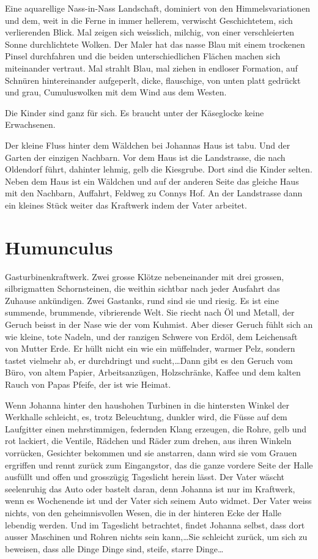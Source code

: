 \documentclass[10pt,titlepage,a5paper]{book}
\begin{document}
Eine aquarellige Nass-in-Nass Landschaft, dominiert von den Himmelsvariationen und dem, weit in die Ferne in immer hellerem, verwischt Geschichtetem, sich verlierenden Blick. Mal zeigen sich weisslich, milchig, von einer verschleierten Sonne durchlichtete Wolken. Der Maler hat das nasse Blau mit einem trockenen Pinsel durchfahren und die beiden unterschiedlichen Flächen machen sich miteinander vertraut. Mal strahlt Blau, mal ziehen in endloser Formation, auf Schnüren hintereinander aufgeperlt, dicke, flauschige,  von unten platt gedrückt und grau, Cumuluswolken mit dem Wind aus dem Westen.

Die Kinder sind ganz für sich. Es braucht unter der Käseglocke keine Erwachsenen. 

Der kleine Fluss hinter dem Wäldchen bei Johannas Haus ist tabu. Und der Garten der einzigen Nachbarn. Vor dem Haus ist die Landstrasse, die nach Oldendorf führt, dahinter lehmig, gelb die Kiesgrube. Dort sind die Kinder selten. Neben dem Haus ist ein Wäldchen und auf der anderen Seite das gleiche Haus mit den Nachbarn, Auffahrt, Feldweg zu Connys Hof. An der Landstrasse dann ein kleines Stück weiter das Kraftwerk indem der Vater arbeitet.



\section*{Humunculus}



Gasturbinenkraftwerk. Zwei grosse Klötze nebeneinander mit drei grossen, silbrigmatten Schornsteinen, die weithin sichtbar nach jeder Ausfahrt das Zuhause ankündigen. Zwei Gastanks, rund sind sie und riesig. Es ist eine summende, brummende, vibrierende Welt. Sie riecht nach Öl und Metall, der Geruch beisst in der Nase wie der vom Kuhmist. Aber dieser Geruch fühlt sich an wie kleine, tote Nadeln, und der ranzigen Schwere von Erdöl, dem Leichensaft von Mutter Erde. Er hüllt nicht ein wie ein müffelnder, warmer Pelz, sondern tastet vielmehr ab, er durchdringt und sucht,\dots Dann gibt es den Geruch vom Büro, von altem Papier, Arbeitsanzügen, Holzschränke, Kaffee und dem kalten Rauch von Papas Pfeife, der ist wie Heimat.

Wenn Johanna hinter den haushohen Turbinen in die hintersten Winkel der Werkhalle schleicht, es, trotz Beleuchtung, dunkler wird, die Füsse auf dem Laufgitter einen mehrstimmigen, federnden Kl\-ang erzeugen, die Rohre, gelb und rot lackiert, die Ventile, Rädchen und Räder zum drehen, aus ihren Winkeln vorrücken, Gesichter bekommen und sie anstarren, dann wird sie vom Grauen ergriffen und rennt zurück zum Eingangstor, das die ganze vordere Seite der Halle ausfüllt und offen und grosszügig Tageslicht herein lässt. Der Vater wäscht seelenruhig das Auto oder bastelt daran, denn Johanna ist nur im Kraftwerk, wenn es Wochenende ist und der Vater sich seinem Auto widmet. Der Vater weiss nichts, von den geheimnisvollen Wesen, die in  der hinteren Ecke der Halle lebendig werden. Und im Tageslicht betrachtet, findet Johanna selbst, dass dort ausser Maschinen und Rohren nichts sein kann,\dots Sie schleicht zurück, um sich zu beweisen, dass alle Dinge Dinge sind, steife, starre Dinge\dots
\end{document}
